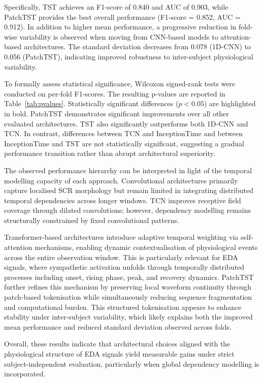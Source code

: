 \documentclass[runningheads]{llncs}
\begin{document}
\vspace{-0.5cm}
Specifically, TST achieves an F1-score of 0.840 and AUC of 0.903, while PatchTST provides the best overall performance (F1-score = 0.852, AUC = 0.912). In addition to higher mean performance, a progressive reduction in fold-wise variability is observed when moving from CNN-based models to attention-based architectures. The standard deviation decreases from 0.078 (1D-CNN) to 0.056 (PatchTST), indicating improved robustness to inter-subject physiological variability.

To formally assess statistical significance, Wilcoxon signed-rank tests were conducted on per-fold F1-scores. The resulting p-values are reported in Table~\ref{tab:pvalues}. Statistically significant differences ($p < 0.05$) are highlighted in bold. PatchTST demonstrates significant improvements over all other evaluated architectures. TST also significantly outperforms both 1D-CNN and TCN. In contrast, differences between TCN and InceptionTime and between InceptionTime and TST are not statistically significant, suggesting a gradual performance transition rather than abrupt architectural superiority.

The observed performance hierarchy can be interpreted in light of the temporal modelling capacity of each approach. Convolutional architectures primarily capture localised SCR morphology but remain limited in integrating distributed temporal dependencies across longer windows. TCN improves receptive field coverage through dilated convolutions; however, dependency modelling remains structurally constrained by fixed convolutional patterns.

Transformer-based architectures introduce adaptive temporal weighting via self-attention mechanisms, enabling dynamic contextualisation of physiological events across the entire observation window. This is particularly relevant for EDA signals, where sympathetic activation unfolds through temporally distributed processes including onset, rising phase, peak, and recovery dynamics. PatchTST further refines this mechanism by preserving local waveform continuity through patch-based tokenisation while simultaneously reducing sequence fragmentation and computational burden. This structured tokenisation appears to enhance stability under inter-subject variability, which likely explains both the improved mean performance and reduced standard deviation observed across folds.

Overall, these results indicate that architectural choices aligned with the physiological structure of EDA signals yield measurable gains under strict subject-independent evaluation, particularly when global dependency modelling is incorporated.
\end{document}
